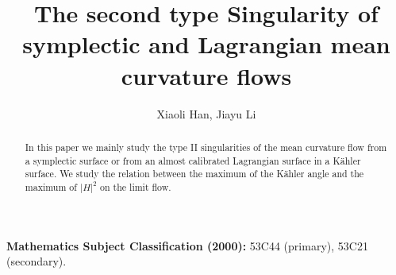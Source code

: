 \newtheorem{theorem}{Theorem}[section]
\newtheorem{corollary}[theorem]{Corollary}
\newtheorem{remark}[theorem]{Remark}
\newtheorem{lemma}[theorem]{Lemma}
\newtheorem{proposition}[theorem]{Proposition}
\newtheorem{definition}{Definition}[section]

\setlength{\textwidth}{6in} \setlength{\oddsidemargin}{.25in}
\setlength{\evensidemargin}{.25in} \setlength{\textheight}{8.5in}
\setlength{\topmargin}{-0.2 in} \setlength{\headheight}{2ex}
\setlength{\headsep}{4ex}




\title [Symplectic and Lagrangian mean curvature flows]
 {The second type Singularity of symplectic and Lagrangian mean curvature flows}
\author{Xiaoli Han, Jiayu Li}

\address{Math. Group, The abdus salam ICTP\\ Trieste 34100,
   Italy}

\address{Math. Group, The abdus salam ICTP\\ Trieste 34100,
   Italy\\
   and Academy of Mathematics and Systems Sciences\\ Chinese Academy of
Sciences\\ Beijing 100080, P. R. of China. } 


\date{}

\maketitle

\begin{abstract}
In this paper we mainly study the type II singularities of the
mean curvature flow from a symplectic surface or from an almost
calibrated Lagrangian surface in a K\"ahler surface. We study the
relation between the maximum of the K\"ahler angle and the maximum
of $|H|^2$ on the limit flow.
\end{abstract}

{\bf Mathematics Subject Classification (2000):} 53C44 (primary),
53C21 (secondary).

